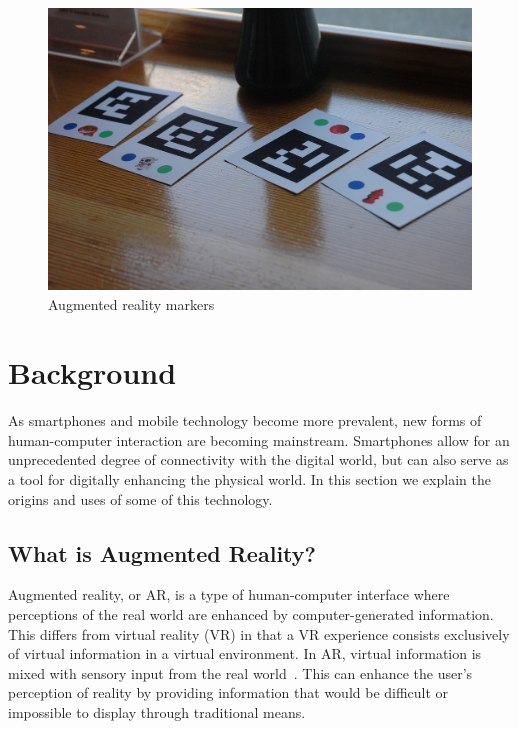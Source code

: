 \documentclass[a4paper, 10pt, american, titlepage]{article}
\begin{document}
\begin{figure}[h]
	\centering
	\includegraphics[width=\textwidth]{ar-marker.jpg}
	\caption[Augmented reality markers]{Augmented reality
		markers~\autocite{jeriaska2010}}
	\label{fig:arMarker}
\end{figure}

\clearpage

\section{Background}
\label{sec:background}

As smartphones and mobile technology become more prevalent, new forms of
human-computer interaction are becoming mainstream. Smartphones allow for an
unprecedented degree of connectivity with the digital world, but can also serve
as a tool for digitally enhancing the physical world. In this section we explain
the origins and uses of some of this technology.

\subsection{What is Augmented Reality?}
\label{sec:whatIsAugmentedReality}

Augmented reality, or AR, is a type of human-computer interface where
perceptions of the real world are enhanced by computer-generated information.
This differs from virtual reality (VR) in that a VR experience consists
exclusively of virtual information in a virtual environment. In AR, virtual
information is mixed with sensory input from the real
world~\autocite{carmigniani2011}. This can enhance the user's perception of
reality by providing information that would be difficult or impossible to
display through traditional means.
\end{document}
